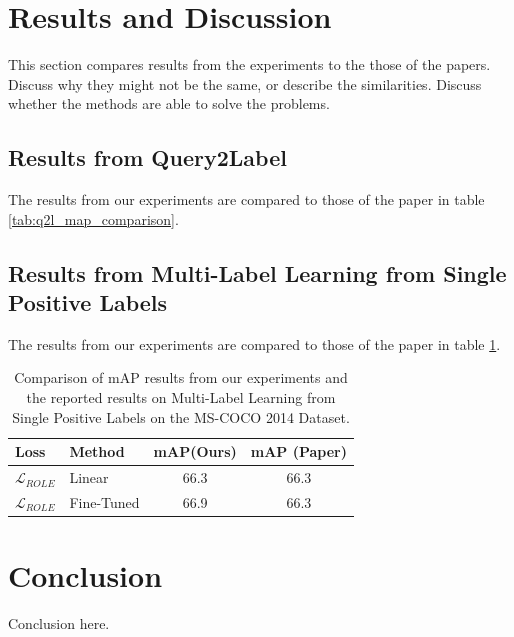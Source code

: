\documentclass[lettersize,journal]{IEEEtran}
\begin{document}

\section{Results and Discussion}
\label{sec:results}
This section compares results from the experiments to the those of the papers. Discuss why they might not be the same, or describe the similarities. Discuss whether the methods are able to solve the problems.


\subsection{Results from Query2Label}
The results from our experiments are compared to those of the paper in table \ref{tab:q2l_map_comparison}. 



\subsection{Results from Multi-Label Learning from Single Positive Labels}
The results from our experiments are compared to those of the paper in table \ref{tab:MLSPL_map_comparison}. 

\begin{table}[H]
    \small
    \caption{Comparison of mAP results from our experiments and the reported results on Multi-Label Learning from Single Positive Labels on the MS-COCO 2014 Dataset.}
    \label{tab:MLSPL_map_comparison}
    \centering
    \begin{tabular}{l l c c}
    \toprule
    \textbf{Loss} & \textbf{Method} & \textbf{mAP(Ours)} & \textbf{mAP (Paper)} \\
    \midrule
    $\mathcal{L}_{ROLE}$ & Linear & 66.3 & 66.3 \\
    $\mathcal{L}_{ROLE}$ & Fine-Tuned & 66.9 & 66.3 \\
    \bottomrule
    \end{tabular}
\end{table}



\section{Conclusion}

Conclusion here.






\end{document}
